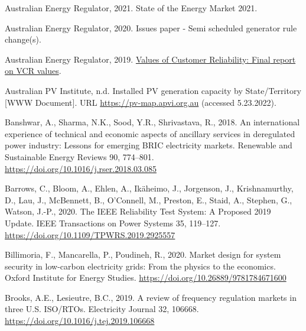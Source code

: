 \documentclass[12pt,a4paper,]{report}
\newlength{\cslhangindent}
\newenvironment{CSLReferences}[2] %
 {%
  \setlength{\parindent}{0pt}
  \ifodd #1 \everypar{\setlength{\hangindent}{\cslhangindent}}\ignorespaces\fi
  \ifnum #2 > 0
  \setlength{\parskip}{#2\baselineskip}
  \fi
 }%
 {}
\begin{document}
\begin{CSLReferences}{1}{0}
\leavevmode{}%
Australian Energy Regulator, 2021. State of the {Energy Market} 2021.

\leavevmode{}%
Australian Energy Regulator, 2020. Issues paper - {Semi} scheduled
generator rule change(s).

\leavevmode{}%
Australian Energy Regulator, 2019.
\href{https://www.aer.gov.au/system/files/AER\%20-\%20Values\%20of\%20Customer\%20Reliability\%20Review\%20-\%20Final\%20Report\%20-\%20December\%202019.pdf}{Values
of {Customer Reliability}: {Final} report on {VCR} values}.

\leavevmode{}%
Australian PV Institute, n.d. Installed {PV} generation capacity by
{State}/{Territory} {[}WWW Document{]}. URL
\url{https://pv-map.apvi.org.au} (accessed 5.23.2022).

\leavevmode{}%
Banshwar, A., Sharma, N.K., Sood, Y.R., Shrivastava, R., 2018. An
international experience of technical and economic aspects of ancillary
services in deregulated power industry: {Lessons} for emerging {BRIC}
electricity markets. Renewable and Sustainable Energy Reviews 90,
774--801. \url{https://doi.org/10.1016/j.rser.2018.03.085}

\leavevmode{}%
Barrows, C., Bloom, A., Ehlen, A., Ikäheimo, J., Jorgenson, J.,
Krishnamurthy, D., Lau, J., McBennett, B., O'Connell, M., Preston, E.,
Staid, A., Stephen, G., Watson, J.-P., 2020. The {IEEE Reliability Test
System}: {A Proposed} 2019 {Update}. IEEE Transactions on Power Systems
35, 119--127. \url{https://doi.org/10.1109/TPWRS.2019.2925557}

\leavevmode{}%
Billimoria, F., Mancarella, P., Poudineh, R., 2020. Market design for
system security in low-carbon electricity grids: From the physics to the
economics. {Oxford Institute for Energy Studies}.
\url{https://doi.org/10.26889/9781784671600}

\leavevmode{}%
Brooks, A.E., Lesieutre, B.C., 2019. A review of frequency regulation
markets in three {U}.{S}. {ISO}/{RTOs}. Electricity Journal 32, 106668.
\url{https://doi.org/10.1016/j.tej.2019.106668}


\end{CSLReferences}
\end{document}
